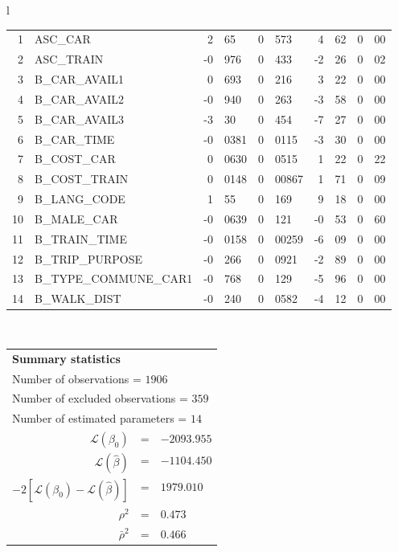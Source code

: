 \begin{tabular}{l}
\begin{tabular}{rlr@{.}lr@{.}lr@{.}lr@{.}l}
1 & ASC_CAR & 2&65 & 0&573 & 4&62 & 0&00\\
2 & ASC_TRAIN & -0&976 & 0&433 & -2&26 & 0&02\\
3 & B_CAR_AVAIL1 & 0&693 & 0&216 & 3&22 & 0&00\\
4 & B_CAR_AVAIL2 & -0&940 & 0&263 & -3&58 & 0&00\\
5 & B_CAR_AVAIL3 & -3&30 & 0&454 & -7&27 & 0&00\\
6 & B_CAR_TIME & -0&0381 & 0&0115 & -3&30 & 0&00\\
7 & B_COST_CAR & 0&0630 & 0&0515 & 1&22 & 0&22\\
8 & B_COST_TRAIN & 0&0148 & 0&00867 & 1&71 & 0&09\\
9 & B_LANG_CODE & 1&55 & 0&169 & 9&18 & 0&00\\
10 & B_MALE_CAR & -0&0639 & 0&121 & -0&53 & 0&60\\
11 & B_TRAIN_TIME & -0&0158 & 0&00259 & -6&09 & 0&00\\
12 & B_TRIP_PURPOSE & -0&266 & 0&0921 & -2&89 & 0&00\\
13 & B_TYPE_COMMUNE_CAR1 & -0&768 & 0&129 & -5&96 & 0&00\\
14 & B_WALK_DIST & -0&240 & 0&0582 & -4&12 & 0&00\\
\hline
\end{tabular}
\\
\begin{tabular}{rcl}
\multicolumn{3}{l}{\bf Summary statistics}\\
\multicolumn{3}{l}{ Number of observations = $1906$} \\
\multicolumn{3}{l}{ Number of excluded observations = $359$} \\
\multicolumn{3}{l}{ Number of estimated  parameters = $14$} \\
 $\mathcal{L}(\beta_0)$ &=&  $-2093.955$ \\
 $\mathcal{L}(\hat{\beta})$ &=& $-1104.450 $  \\
 $-2[\mathcal{L}(\beta_0) -\mathcal{L}(\hat{\beta})]$ &=& $1979.010$ \\
    $\rho^2$ &=&   $0.473$ \\
    $\bar{\rho}^2$ &=&    $0.466$ \\
\end{tabular}
  \end{tabular}
